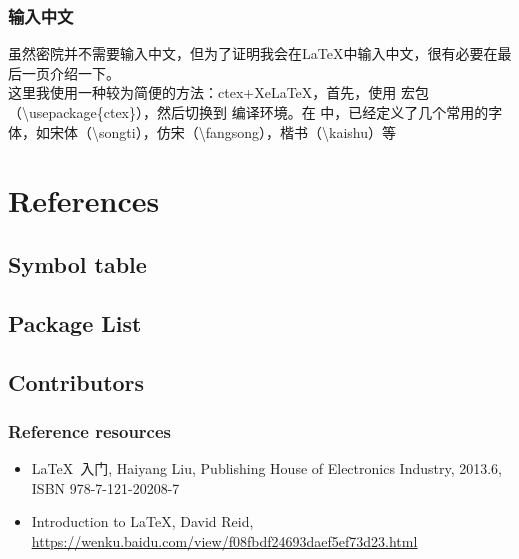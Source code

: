 \documentclass{beamer}
\newcommand{\samplecommand}[1]{\alert{\textbackslash #1}}
\begin{document}
\begin{frame}
	\songti
	\frametitle{输入中文}
	\qquad 虽然密院并不需要输入中文，但为了证明我会在\LaTeX 中输入中文，很有必要在最后一页介绍一下。\\
	\qquad 这里我使用一种较为简便的方法：ctex+XeLaTeX，首先，使用  宏包（\samplecommand{usepackage}\{ctex\}），然后切换到  编译环境。在  中，已经定义了几个常用的字体，如宋体（\samplecommand{songti}），仿宋（\samplecommand{fangsong}），楷书（\samplecommand{kaishu}）等
\end{frame}

\section{References}
\begin{frame}
\end{frame}

\subsection{Symbol table}

\begin{frame}

\end{frame}

\subsection{Package List}

\begin{frame}

\end{frame}

\subsection{Contributors}

\begin{frame}
	\frametitle{Reference resources}
	\songti
	\begin{itemize}
		\item \LaTeX\ 入门, Haiyang Liu, Publishing House of Electronics Industry, 2013.6, ISBN 978-7-121-20208-7
		\item Introduction to \LaTeX, David Reid, \href{https://wenku.baidu.com/view/f08fbdf24693daef5ef73d23.html}{\color{blue}\uline{https://wenku.baidu.com/view/f08fbdf24693daef5ef73d23.html}}
	\end{itemize}
\end{frame}
\end{document}
